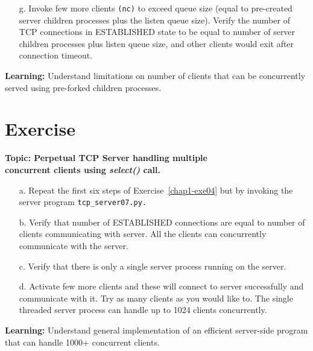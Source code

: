 \begin{multicols}{2}
\begin{itemize}
\item[g.] Invoke few more clients \texttt{(nc)} to exceed queue size (equal to pre-created server children processes plus the listen queue size). Verify the number of TCP connections in ESTABLISHED state to be equal to number of server children processes plus listen queue size, and other clients would exit after connection timeout.
\end{itemize}

\vspace{-.3cm}

\textbf{Learning:} Understand limitations on number of clients that can be concurrently served using pre-forked children processes.

\vspace{-.3cm}

\section*{Exercise \label{chap1-exe05}}

\textbf{Topic: Perpetual TCP Server handling multiple\\ concurrent clients using \textit{select()} call.}

\vspace{-.3cm}

\begin{itemize}

\item[a.] Repeat the first six steps of Exercise~\ref{chap1-exe04} but by invoking the server program \texttt{tcp\_server07.py.}

\item[b.] Verify that number of ESTABLISHED connections are equal to number of clients communicating with server. All the clients can concurrently communicate with the server.

\item[c.] Verify that there is only a single server process running on the server.

\item[d.] Activate few more clients and these will connect to server successfully and communicate with it. Try as many clients as you would like to. The single threaded server process can handle up to 1024 clients concurrently.

\end{itemize}

\vspace{-.3cm}

\textbf{Learning:}  Understand general implementation of an efficient server-side program that can handle 1000+ concurrent clients.


\end{multicols}
